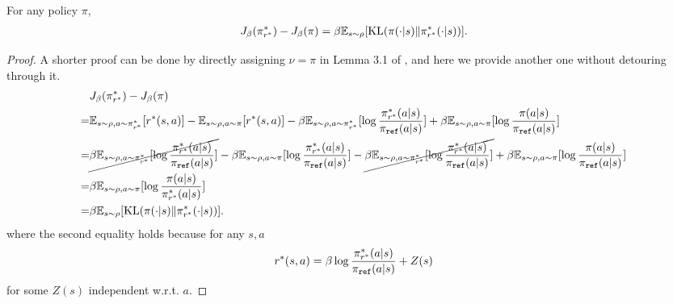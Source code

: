 %
\begin{lemma}\label{lem:KL_as_value_gap}
    For any policy $\pi$,
    \begin{align*}
        J_\beta(\pi^*_{r^*}) - J_\beta(\pi) = \beta \mathbb{E}_{s\sim\rho}[\text{KL}(\pi(\cdot|s)\|\pi^*_{r^*}(\cdot|s))].
    \end{align*}
\end{lemma}
\begin{proof}
    A shorter proof can be done by directly assigning $\nu = \pi$ in Lemma 3.1 of \citep{xie2024exploratory}, and here we provide another one without detouring through it.
    \begin{align*}
        &J_\beta(\pi^*_{r^*}) - J_\beta(\pi) \\
        =& \mathbb{E}_{s\sim\rho,a\sim\pi^*_{r^*}}[r^*(s,a)] - \mathbb{E}_{s\sim\rho,a\sim\pi}[r^*(s,a)] - \beta \mathbb{E}_{s\sim\rho,a\sim\pi^*_{r^*}}[\log\frac{\pi^*_{r^*}(a|s)}{\pi_{\texttt{ref}}(a|s)}] + \beta \mathbb{E}_{s\sim\rho,a\sim\pi}[\log\frac{\pi(a|s)}{\pi_{\texttt{ref}}(a|s)}] \\
        =& \cancel{\beta \mathbb{E}_{s\sim\rho,a\sim\pi^*_{r^*}}[\log\frac{\pi^*_{r^*}(a|s)}{\pi_{\texttt{ref}}(a|s)}]} - \beta \mathbb{E}_{s\sim\rho,a\sim\pi}[\log\frac{\pi^*_{r^*}(a|s)}{\pi_{\texttt{ref}}(a|s)}] - \cancel{\beta \mathbb{E}_{s\sim\rho,a\sim\pi^*_{r^*}}[\log\frac{\pi^*_{r^*}(a|s)}{\pi_{\texttt{ref}}(a|s)}]} + \beta \mathbb{E}_{s\sim\rho,a\sim\pi}[\log\frac{\pi(a|s)}{\pi_{\texttt{ref}}(a|s)}] \\
        =& \beta \mathbb{E}_{s\sim\rho,a\sim\pi}[\log\frac{\pi(a|s)}{\pi^*_{r^*}(a|s)}] \\
        =& \beta \mathbb{E}_{s\sim\rho}[\text{KL}(\pi(\cdot|s)\|\pi^*_{r^*}(\cdot|s))].
    \end{align*}
    where the second equality holds because for any $s,a$
    \begin{align*}
        r^*(s,a) = \beta \log\frac{\pi^*_{r^*}(a|s)}{\pi_{\texttt{ref}}(a|s)} + Z(s)
    \end{align*}
    for some $Z(s)$ independent w.r.t. $a$.
\end{proof}


